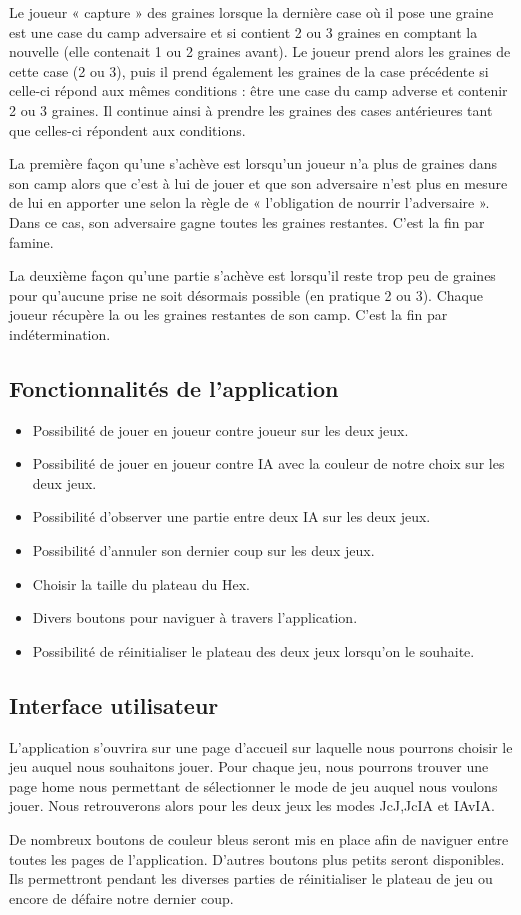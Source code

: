 \begin{itemize}
    Le joueur « capture » des graines lorsque la dernière case où il pose une graine est une case du camp adversaire et si contient 2 ou 3 
    graines en comptant la nouvelle (elle contenait 1 ou 2 graines avant). Le joueur prend alors les graines de cette case (2 ou 3), puis il 
    prend également les graines de la case précédente si celle-ci répond aux mêmes conditions : être une case du camp adverse et contenir 2 ou 3 graines. 
    Il continue ainsi à prendre les graines des cases antérieures tant que celles-ci répondent aux conditions.

    La première façon qu'une s'achève est lorsqu’un joueur n’a plus de graines dans son camp alors que c’est à lui de jouer et que son adversaire n’est plus en mesure 
    de lui en apporter une selon la règle de « l’obligation de nourrir l’adversaire ». Dans ce cas, son adversaire gagne toutes les graines restantes. C’est 
    la fin par famine.

    La deuxième façon qu'une partie s'achève est lorsqu’il reste trop peu de graines pour qu’aucune prise ne soit désormais possible (en pratique 2 ou 3). 
    Chaque joueur récupère la ou les graines restantes de son camp. C’est la fin par indétermination.
    

\end{itemize}

\subsection*{Fonctionnalités de l'application}
\begin{itemize}
    \item Possibilité de jouer en joueur contre joueur sur les deux jeux.
    \item Possibilité de jouer en joueur contre IA avec la couleur de notre choix sur les deux jeux.
    \item Possibilité d'observer une partie entre deux IA sur les deux jeux.
    \item Possibilité d'annuler son dernier coup sur les deux jeux.
    \item Choisir la taille du plateau du Hex. 
    \item Divers boutons pour naviguer à travers l'application.
    \item Possibilité de réinitialiser le plateau des deux jeux lorsqu'on le souhaite.
\end{itemize}

\subsection*{Interface utilisateur}
L'application s'ouvrira sur une page d'accueil sur laquelle nous pourrons choisir le jeu auquel nous souhaitons jouer.
Pour chaque jeu, nous pourrons trouver une page home nous permettant de sélectionner le mode de jeu auquel nous voulons
jouer. Nous retrouverons alors pour les deux jeux les modes JcJ,JcIA et IAvIA.

De nombreux boutons de couleur bleus seront mis en place afin de naviguer entre toutes les pages de l'application. D'autres
boutons plus petits seront disponibles. Ils permettront pendant les diverses parties de réinitialiser le plateau de jeu ou encore de défaire 
notre dernier coup.



